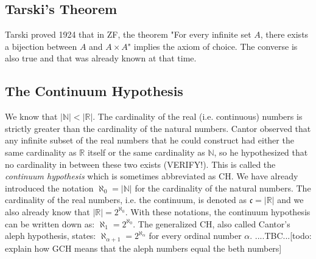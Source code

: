 

\subsection{Tarski's Theorem}
Tarski proved 1924 that in ZF, the theorem "For every infinite set $A$, there exists a bijection between $A$ and $A \times A$" implies the axiom of choice. The converse is also true and that was already known at that time. 



\subsection{The Continuum Hypothesis}
We know that $|\mathbb{N}| < |\mathbb{R}|$. The cardinality of the real (i.e. continuous) numbers is strictly greater than the cardinality of the natural numbers. Cantor observed that any infinite subset of the real numbers that he could construct had either the same cardinality as $\mathbb{R}$ itself or the same cardinality as $\mathbb{N}$, so he hypothesized that no cardinality in between these two exists (VERIFY!). This is called the \emph{continuum hypothesis} which is sometimes abbreviated as CH. We have already introduced the notation $\aleph_0 = |\mathbb{N}|$ for the cardinality of the natural numbers. The cardinality of the real numbers, i.e. the continuum, is denoted as $\mathfrak{c} = |\mathbb{R}|$ and we also already know that $|\mathbb{R}| = 2^{\aleph_0}$. With these notations, the continuum hypothesis can be written down as: $\aleph_1 = 2^{\aleph_0}$. The generalized CH, also called Cantor's aleph hypothesis, states: $\aleph_{\alpha+1} = 2^{\aleph_{\alpha}}$ for every ordinal number $\alpha$. ....TBC...[todo: explain how GCH means that the aleph numbers equal the beth numbers]

